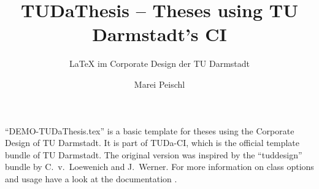 \documentclass[
	english,%
	accentcolor=9c,%
	ruledheaders=section,%
	class=report,%
	thesis={type=bachelor},%
	fontsize=11pt,%
	parskip=half-,%
	custommargins=true,%
	marginpar=false,%
	accept-missing-logos=true,%
]{tudapub}
\title{TUDaThesis -- Theses using TU Darmstadt's CI}
\subtitle{\LaTeX{} im Corporate Design der TU Darmstadt}
\author{Marei Peischl}
\institute{Institute}
\begin{document}
\maketitle


\tableofcontents



\enquote{DEMO-TUDaThesis.tex} is a basic template for theses using the Corporate Design of TU Darmstadt.
It is part of TUDa-CI, which is the official template bundle of TU Darmstadt. The original version was inspired by the \enquote{tuddesign} bundle by C.~v.~Loewenich and J.~Werner.
For more information on class options and usage have a look at the documentation \cite{tuda-ci}.


\printbibliography
\end{document}
